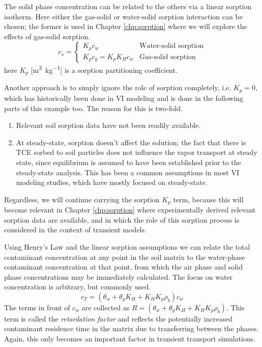 The solid phase concentration can be related to the others via a linear sorption isotherm.
Here either the gas-solid or water-solid sorption interaction can be chosen; the former is used in Chapter \ref{chp:sorption} where we will explore the effects of gas-solid sorption.
\begin{equation}
  c_s = \begin{cases}
    K_p c_w & \text{Water-solid sorption} \\
    K_p c_g = K_p K_H c_w & \text{Gas-solid sorption}
\end{cases}
\end{equation}
here $K_p$ [\si{\metre\cubed\per\kilogram}] is a sorption partitioning coefficient.\par

Another approach is to simply ignore the role of sorption completely, i.e. $K_p = 0$, which has historically been done in VI modeling and is done in the following parts of this example too.
The reason for this is two-fold.
\begin{enumerate}
  \item Relevant soil sorption data have not been readily available.
  \item At steady-state, sorption doesn't affect the solution; the fact that there is TCE sorbed to soil particles does not influence the vapor transport at steady state, since equilibrium is assumed to have been established prior to the steady-state analysis. This has been a common assumptions in most VI modeling studies, which have mostly focused on steady-state.
\end{enumerate}
Regardless, we will continue carrying the sorption $K_p$ term, because this will become relevant in Chapter \ref{chp:sorption} where experimentally derived relevant sorption data are available, and in which the role of this sorption process is considered in the context of transient models.\par

Using Henry's Law and the linear sorption assumptions we can relate the total contaminant concentration at any point in the soil matrix to the water-phase contaminant concentration at that point, from which the air phase and solid phase concentrations may be immediately calculated.
The focus on water concentration is arbitrary, but commonly used.
\begin{equation}
  c_T = (\theta_w + \theta_g K_H + K_H K_p \rho_b) c_w
\end{equation}
The terms in front of $c_w$ are collected as $R = (\theta_w + \theta_g K_H + K_H K_p \rho_b)$.
This term is called the \textit{retardation factor} and reflects the potentially increased contaminant residence time in the matrix due to transferring between the phases.
Again, this only becomes an important factor in transient transport simulations.\par

